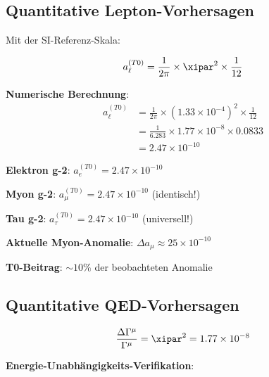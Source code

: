 	\subsection{Quantitative Lepton-Vorhersagen}
	
	Mit der SI-Referenz-Skala:
	
	\begin{equation}
		a_{\ell}^{(T0)} = \frac{1}{2\pi} \times \xipar^2 \times \frac{1}{12}
		\label{eq:quantitative_lepton_correction}
	\end{equation}
	
	\textbf{Numerische Berechnung}:
	\begin{align}
		a_{\ell}^{(T0)} &= \frac{1}{2\pi} \times (1.33 \times 10^{-4})^2 \times \frac{1}{12} \\
		&= \frac{1}{6.283} \times 1.77 \times 10^{-8} \times 0.0833 \\
		&= 2.47 \times 10^{-10}
	\end{align}
	
	\begin{tcolorbox}[colback=blue!5!white,colframe=blue!75!black,title=Universelle Lepton-Vorhersage]
		\textbf{Elektron g-2}: $a_e^{(T0)} = 2.47 \times 10^{-10}$
		
		\textbf{Myon g-2}: $a_{\mu}^{(T0)} = 2.47 \times 10^{-10}$ (identisch!)
		
		\textbf{Tau g-2}: $a_{\tau}^{(T0)} = 2.47 \times 10^{-10}$ (universell!)
		
		\textbf{Aktuelle Myon-Anomalie}: $\Delta a_{\mu} \approx 25 \times 10^{-10}$
		
		\textbf{T0-Beitrag}: $\sim 10\%$ der beobachteten Anomalie
	\end{tcolorbox}
	
	\subsection{Quantitative QED-Vorhersagen}
	
	\begin{equation}
		\frac{\Delta\Gamma^{\mu}}{\Gamma^{\mu}} = \xipar^2 = 1.77 \times 10^{-8}
		\label{eq:quantitative_qed_correction}
	\end{equation}
	
	\textbf{Energie-Unabhängigkeits-Verifikation}:
	\begin{table}[htbp]
		\centering
		\caption{Energie-unabhängige T0-Korrekturen vs. Standardmodell}
	\end{table}

